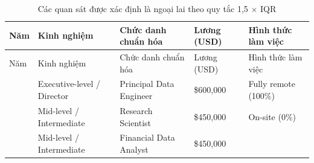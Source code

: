 \begin{longtable}[]{@{}
  >{\raggedright\arraybackslash}p{}
  >{\raggedright\arraybackslash}p{}
  >{\raggedright\arraybackslash}p{}
  >{\raggedright\arraybackslash}p{}
  >{\raggedright\arraybackslash}p{}@{}}
\caption{Các quan sát được xác định là ngoại lai theo quy tắc 1,5 \(\times\)
IQR}\tabularnewline
\toprule\noalign{}
\begin{minipage}[b]{\linewidth}\raggedright
Năm
\end{minipage} & \begin{minipage}[b]{\linewidth}\raggedright
Kinh nghiệm
\end{minipage} & \begin{minipage}[b]{\linewidth}\raggedright
Chức danh chuẩn hóa
\end{minipage} & \begin{minipage}[b]{\linewidth}\raggedright
Lương (USD)
\end{minipage} & \begin{minipage}[b]{\linewidth}\raggedright
Hình thức làm việc
\end{minipage} \\
\midrule\noalign{}
\endfirsthead
\toprule\noalign{}
\begin{minipage}[b]{\linewidth}\raggedright
Năm
\end{minipage} & \begin{minipage}[b]{\linewidth}\raggedright
Kinh nghiệm
\end{minipage} & \begin{minipage}[b]{\linewidth}\raggedright
Chức danh chuẩn hóa
\end{minipage} & \begin{minipage}[b]{\linewidth}\raggedright
Lương (USD)
\end{minipage} & \begin{minipage}[b]{\linewidth}\raggedright
Hình thức làm việc
\end{minipage} \\
\midrule\noalign{}
\endhead
\bottomrule\noalign{}
\endlastfoot
2021 & Executive-level / Director & Principal Data Engineer & \$600,000
& Fully remote (100\%) \\
2020 & Mid-level / Intermediate & Research Scientist & \$450,000 &
On-site (0\%) \\
2021 & Mid-level / Intermediate & Financial Data Analyst & \$450,000 &

\end{longtable}
